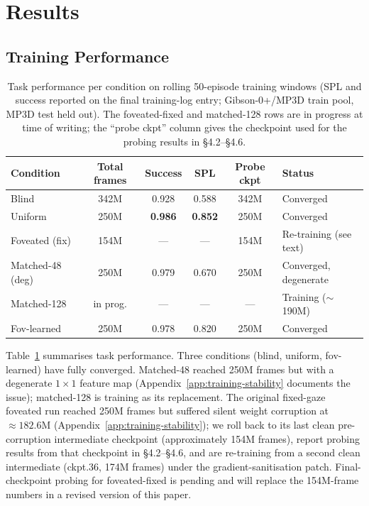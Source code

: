 \documentclass[10pt,conference,compsocconf]{IEEEtran}
\begin{document}
\section{Results}

\subsection{Training Performance}

\begin{table}[t]
\centering
\caption{Task performance per condition on rolling 50-episode training windows (SPL and success reported on the final training-log entry; Gibson-0+/MP3D train pool, MP3D test held out). The foveated-fixed and matched-128 rows are in progress at time of writing; the ``probe ckpt'' column gives the checkpoint used for the probing results in §4.2--§4.6.}
\label{tab:training}
\begin{tabular}{lccccl}
\toprule
Condition & Total frames & Success & SPL & Probe ckpt & Status \\
\midrule
Blind            & 342M & 0.928 & 0.588 & 342M  & Converged \\
Uniform          & 250M & \textbf{0.986} & \textbf{0.852} & 250M  & Converged \\
Foveated (fix)   & 154M & ---   & ---   & 154M  & Re-training (see text) \\
Matched-48 (deg) & 250M & 0.979 & 0.670 & 250M  & Converged, degenerate \\
Matched-128      & in prog. & --- & ---  & ---   & Training ($\sim$190M) \\
Fov-learned      & 250M & 0.978 & 0.820 & 250M  & Converged \\
\bottomrule
\end{tabular}
\end{table}

Table~\ref{tab:training} summarises task performance. Three conditions (blind, uniform, fov-learned) have fully converged. Matched-48 reached 250M frames but with a degenerate $1\times 1$ feature map (Appendix~\ref{app:training-stability} documents the issue); matched-128 is training as its replacement. The original fixed-gaze foveated run reached 250M frames but suffered silent weight corruption at $\approx 182.6$M (Appendix~\ref{app:training-stability}); we roll back to its last clean pre-corruption intermediate checkpoint (approximately 154M frames), report probing results from that checkpoint in §4.2--§4.6, and are re-training from a second clean intermediate (ckpt.36, 174M frames) under the gradient-sanitisation patch. Final-checkpoint probing for foveated-fixed is pending and will replace the 154M-frame numbers in a revised version of this paper.
\end{document}
